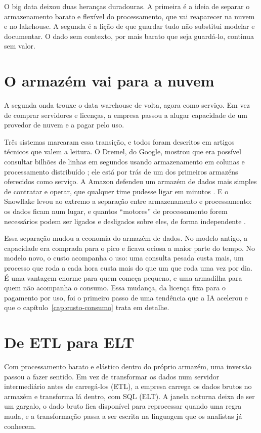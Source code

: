 O big data deixou duas heranças duradouras. A primeira é a ideia de separar o
armazenamento barato e flexível do processamento, que vai reaparecer na nuvem e no
lakehouse. A segunda é a lição de que guardar tudo não substitui modelar e documentar. O
dado sem contexto, por mais barato que seja guardá-lo, continua sem valor.

\section{O armazém vai para a nuvem}
\label{sec:dw-nuvem}

A segunda onda trouxe o data warehouse de volta, agora como serviço. Em vez de comprar
servidores e licenças, a empresa passou a alugar capacidade de um provedor de nuvem e a
pagar pelo uso.

Três sistemas marcaram essa transição, e todos foram descritos em artigos técnicos que
valem a leitura. O Dremel, do Google, mostrou que era possível consultar bilhões de
linhas em segundos usando armazenamento em colunas e processamento distribuído
\parencite{melnik2010}; ele está por trás de um dos primeiros armazéns oferecidos como
serviço. A Amazon defendeu um armazém de dados mais simples de contratar e operar, que
qualquer time pudesse ligar em minutos \parencite{gupta2015}. E o Snowflake levou ao
extremo a separação entre armazenamento e processamento: os dados ficam num lugar, e
quantos \enquote{motores} de processamento forem necessários podem ser ligados e
desligados sobre eles, de forma independente \parencite{dageville2016}.

Essa separação mudou a economia do armazém de dados. No modelo antigo, a capacidade era
comprada para o pico e ficava ociosa a maior parte do tempo. No modelo novo, o custo
acompanha o uso: uma consulta pesada custa mais, um processo que roda a cada hora custa
mais do que um que roda uma vez por dia. É uma vantagem enorme para quem começa pequeno,
e uma armadilha para quem não acompanha o consumo. Essa mudança, da licença fixa para o
pagamento por uso, foi o primeiro passo de uma tendência que a IA acelerou e que o
capítulo~\ref{cap:custo-consumo} trata em detalhe.

\section{De ETL para ELT}
\label{sec:elt}

Com processamento barato e elástico dentro do próprio armazém, uma inversão passou a
fazer sentido. Em vez de transformar os dados num servidor intermediário antes de
carregá-los (ETL), a empresa carrega os dados brutos no armazém e transforma lá dentro,
com SQL (ELT). A janela noturna deixa de ser um gargalo, o dado bruto fica disponível
para reprocessar quando uma regra muda, e a transformação passa a ser escrita na
linguagem que os analistas já conhecem.

